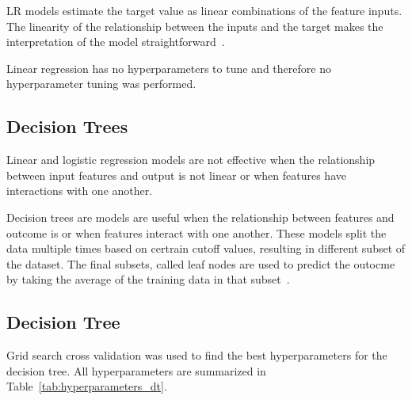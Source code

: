 \ac{LR} models estimate the target value as linear combinations of the
feature inputs.
The linearity of the relationship between the inputs and the target makes the
interpretation of the model straightforward~\cite[p.
37]{molnar2020interpretable}.


Linear regression has no hyperparameters to tune and therefore no
hyperparameter tuning was
performed.

\subsection{Decision Trees}\label{subsec:decision-trees}
Linear and logistic regression models are not effective when the relationship
between input
features and output is not linear or when features have interactions with one
another.

Decision trees are models are useful when the relationship between features
and outcome is
or when features interact with one another.
These models split the data multiple times based on certrain cutoff values,
resulting in
different subset of the dataset.
The final subsets, called leaf nodes are used to predict the outocme by
taking the average of the
training data in that subset~\cite[p. 76]{molnar2020interpretable}.

\subsection{Decision Tree}\label{subsec:decision-tree}
Grid search cross validation was used to find the best hyperparameters for
the decision tree.
All hyperparameters are summarized in Table~\ref{tab:hyperparameters_dt}.


